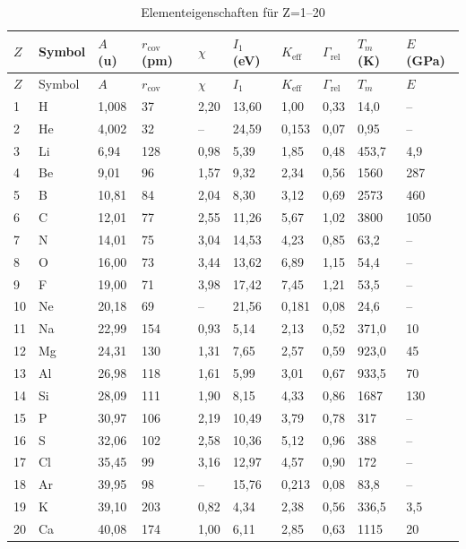 \documentclass[12pt,a4paper]{article}
\newcommand{\Keff}{K_{\mathrm{eff}}}
\begin{document}
	\begin{longtable}{p{0.6cm}p{1.2cm}p{1.2cm}p{1.2cm}p{1.2cm}p{1.2cm}p{1.5cm}p{1.2cm}p{1.2cm}p{1.2cm}}
		\caption{Elementeigenschaften für Z=1–20} \label{tab:elem-data-first20} \\
		\toprule
		\(Z\) & Symbol & \(A\) (u) & \(r_{\text{cov}}\) (pm) & \(\chi\) & \(I_1\) (eV) & \(\Keff\) & \(\Gamma_{\text{rel}}\) & \(T_m\) (K) & \(E\) (GPa) \\
		\midrule
		\endfirsthead
		\toprule
		\(Z\) & Symbol & \(A\) & \(r_{\text{cov}}\) & \(\chi\) & \(I_1\) & \(\Keff\) & \(\Gamma_{\text{rel}}\) & \(T_m\) & \(E\) \\
		\midrule
		\endhead
		1  & H  & 1,008  & 37   & 2,20 & 13,60 & 1,00  & 0,33  & 14,0  & – \\
		2  & He & 4,002  & 32   & –    & 24,59 & 0,153 & 0,07  & 0,95  & – \\
		3  & Li & 6,94   & 128  & 0,98 & 5,39  & 1,85  & 0,48  & 453,7 & 4,9 \\
		4  & Be & 9,01   & 96   & 1,57 & 9,32  & 2,34  & 0,56  & 1560  & 287 \\
		5  & B  & 10,81  & 84   & 2,04 & 8,30  & 3,12  & 0,69  & 2573  & 460\footnotemark \\
		6  & C  & 12,01  & 77   & 2,55 & 11,26 & 5,67  & 1,02  & 3800  & 1050\footnotemark \\
		7  & N  & 14,01  & 75   & 3,04 & 14,53 & 4,23  & 0,85  & 63,2  & – \\
		8  & O  & 16,00  & 73   & 3,44 & 13,62 & 6,89  & 1,15  & 54,4  & – \\
		9  & F  & 19,00  & 71   & 3,98 & 17,42 & 7,45  & 1,21  & 53,5  & – \\
		10 & Ne & 20,18  & 69   & –    & 21,56 & 0,181 & 0,08  & 24,6  & – \\
		11 & Na & 22,99  & 154  & 0,93 & 5,14  & 2,13  & 0,52  & 371,0 & 10 \\
		12 & Mg & 24,31  & 130  & 1,31 & 7,65  & 2,57  & 0,59  & 923,0 & 45 \\
		13 & Al & 26,98  & 118  & 1,61 & 5,99  & 3,01  & 0,67  & 933,5 & 70 \\
		14 & Si & 28,09  & 111  & 1,90 & 8,15  & 4,33  & 0,86  & 1687  & 130 \\
		15 & P  & 30,97  & 106  & 2,19 & 10,49 & 3,79  & 0,78  & 317   & – \\
		16 & S  & 32,06  & 102  & 2,58 & 10,36 & 5,12  & 0,96  & 388   & – \\
		17 & Cl & 35,45  & 99   & 3,16 & 12,97 & 4,57  & 0,90  & 172   & – \\
		18 & Ar & 39,95  & 98   & –    & 15,76 & 0,213 & 0,08  & 83,8  & – \\
		19 & K  & 39,10  & 203  & 0,82 & 4,34  & 2,38  & 0,56  & 336,5 & 3,5 \\
		20 & Ca & 40,08  & 174  & 1,00 & 6,11  & 2,85  & 0,63  & 1115  & 20 \\
		\bottomrule
	\end{longtable}
\end{document}
